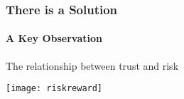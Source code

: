 \begin{frame}
  \frametitle{There is a Solution}
  \framesubtitle{A Key Observation}
  The relationship between trust and risk

  \texttt{[image: riskreward]}

\end{frame}
